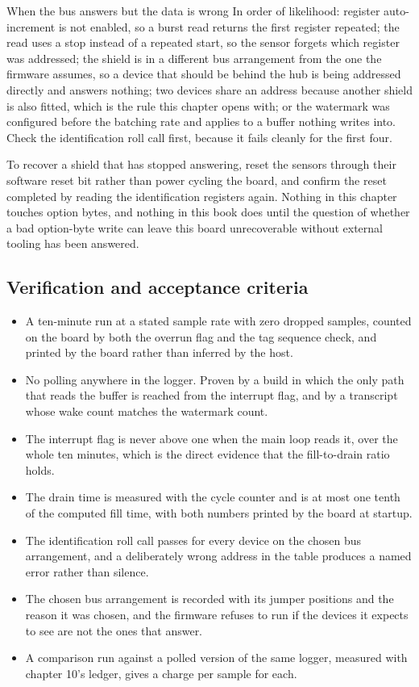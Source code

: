\begin{note}{When the bus answers but the data is wrong}
In order of likelihood: register auto-increment is not enabled, so a burst read
returns the first register repeated; the read uses a stop instead of a repeated
start, so the sensor forgets which register was addressed; the shield is in a
different bus arrangement from the one the firmware assumes, so a device that
should be behind the hub is being addressed directly and answers nothing; two
devices share an address because another shield is also fitted, which is the
rule this chapter opens with; or the watermark was configured before the
batching rate and applies to a buffer nothing writes into. Check the
identification roll call first, because it fails cleanly for the first four.
\end{note}

To recover a shield that has stopped answering, reset the sensors through their
software reset bit rather than power cycling the board, and confirm the reset
completed by reading the identification registers again. Nothing in this chapter
touches option bytes, and nothing in this book does until the question of
whether a bad option-byte write can leave this board unrecoverable without
external tooling has been answered.

\subsection*{Verification and acceptance criteria}

\begin{itemize}
\item A ten-minute run at a stated sample rate with zero dropped samples,
counted on the board by both the overrun flag and the tag sequence check, and
printed by the board rather than inferred by the host.
\item No polling anywhere in the logger. Proven by a build in which the only
path that reads the buffer is reached from the interrupt flag, and by a
transcript whose wake count matches the watermark count.
\item The interrupt flag is never above one when the main loop reads it, over
the whole ten minutes, which is the direct evidence that the fill-to-drain ratio
holds.
\item The drain time is measured with the cycle counter and is at most one tenth
of the computed fill time, with both numbers printed by the board at startup.
\item The identification roll call passes for every device on the chosen bus
arrangement, and a deliberately wrong address in the table produces a named
error rather than silence.
\item The chosen bus arrangement is recorded with its jumper positions and the
reason it was chosen, and the firmware refuses to run if the devices it expects
to see are not the ones that answer.
\item A comparison run against a polled version of the same logger, measured
with chapter 10's ledger, gives a charge per sample for each.
\end{itemize}

